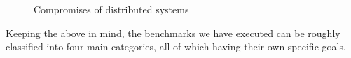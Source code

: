 \begin{figure}[htbp]
  \begin{center}
    \caption{Compromises of distributed systems\label{fig:compr}}
   \end{center}
\end{figure}

Keeping the above in mind, the benchmarks we have executed can be roughly
classified into four main categories, all of which having their own specific
goals.

